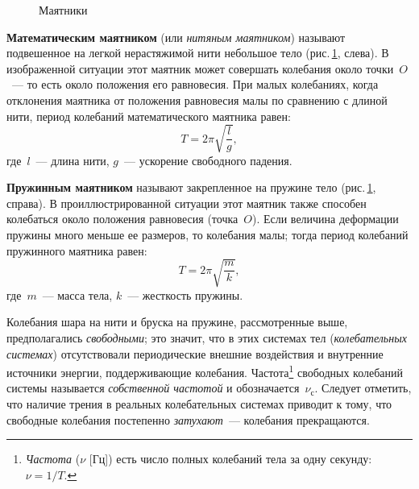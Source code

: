 \documentclass[main.tex]{subfiles}
\begin{document}
\begin{figure}[H]%
\hfill
{}%
\mbox{}
\hfill
{}%
\hfill
\mbox{}
\caption{Маятники}
\label{fig:p61}
\end{figure}

\textbf{Математическим маятником} (или \emph{нитяным маятником}) называют подвешенное на легкой нерастяжимой нити небольшое тело (рис.\,\ref{fig:p61}, слева). В изображенной ситуации этот маятник может совершать колебания около точки~$O$~--- то есть около положения его равновесия. При малых колебаниях, когда отклонения маятника от положения равновесия малы по сравнению с длиной нити, период колебаний математического маятника равен:
\begin{equation}
    T=2\pi\sqrt{\dfrac{l}{g}},
\end{equation}
где~$l$~--- длина нити, $g$~--- ускорение свободного падения.

\textbf{Пружинным маятником} называют закрепленное на пружине тело (рис.\,\ref{fig:p61}, справа). В проиллюстрированной ситуации этот маятник также способен колебаться около положения равновесия (точка~$O$). Если величина деформации пружины много меньше ее размеров, то колебания малы; тогда период колебаний пружинного маятника равен:
\begin{equation}
    T=2\pi\sqrt{\dfrac{m}{k}},
\end{equation}
где~$m$~--- масса тела, $k$~--- жесткость пружины.

Колебания шара на нити и бруска на пружине, рассмотренные выше, предполагались \emph{свободными}; это значит, что в этих системах тел (\emph{колебательных системах}) отсутствовали периодические внешние воздействия и внутренние источники энергии, поддерживающие колебания. Частота\footnote{\emph{Частота} ($\nu$ [Гц]) есть число полных колебаний тела за одну секунду: $\nu=1/T$.} свободных колебаний системы называется \emph{собственной частотой} и обозначается~$\nu_\text{с}$. Следует отметить, что наличие трения в реальных колебательных системах приводит к тому, что свободные колебания постепенно \emph{затухают}~--- колебания прекращаются.
\end{document}
